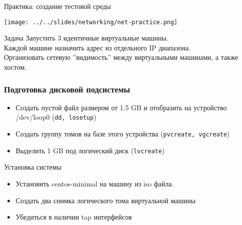 \begin{frame}{Практика: создание тестовой среды}

	\center\texttt{[image: ../../slides/networking/net-practice.png]}


	\begin{block}{Задача}
		Запустить 3 идентичные виртуальные машины.\\
		Каждой машине назначить адрес из отдельного IP диапазона.\\
		Организовать сетевую ''видимость'' между виртуальными машинами, а также хостом.		
	\end{block}

\end{frame}



\begin{frame}
	\frametitle{Подготовка дисковой подсистемы}
			\begin{itemize}
				\item Создать пустой файл размером от 1.5 GB и отобразить на устройство
					/dev/loop0 ({\tt dd, losetup})
				\item Создать группу томов на базе этого устройства ({\tt pvcreate, vgcreate})
				\item Выделить 1 GB под логический диск ({\tt lvcreate})
			\end{itemize}
\end{frame}

\begin{frame}[fragile]{Установка системы}
        \begin{itemize}
		\item Установить centos-minimal на  машину из iso файла.
		\item Создать два снимка логического тома виртуальной машины
		\item Убедиться в наличии tap интерфейсов
	\end{itemize}

\end{frame}

